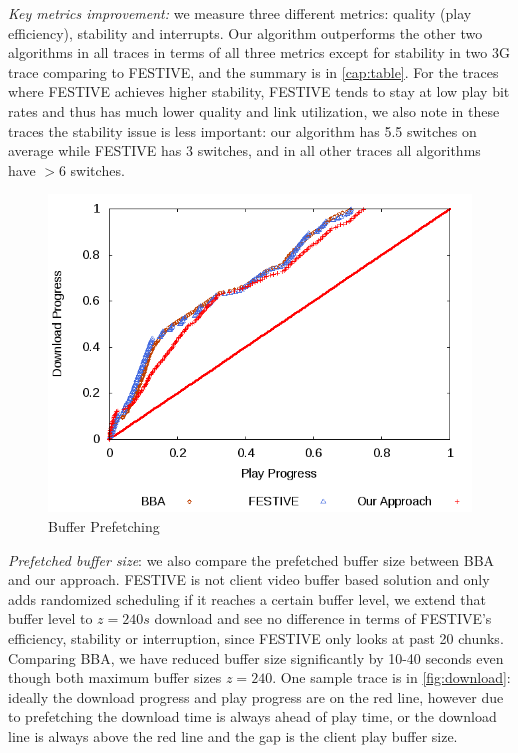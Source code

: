 \emph{Key metrics improvement:} we measure three different metrics: quality (play efficiency), stability and interrupts. Our algorithm outperforms the other two algorithms in all traces in terms of all three metrics except for stability in two 3G trace comparing to FESTIVE, and the summary is in \autoref{cap:table}. For the traces where FESTIVE achieves higher stability, FESTIVE tends to stay at low play bit rates and thus has much lower quality and link utilization, we also note in these traces the stability issue is less important: our algorithm has 5.5 switches on average while FESTIVE has 3 switches, and in all other traces all algorithms have $>$6 switches. 
\begin{figure}[t]
\centering
 \includegraphics[width=0.8\linewidth]{pictures/ATT_downloading.png}
 \caption{Buffer Prefetching} \label{fig:download}
\end{figure}

\emph{Prefetched buffer size}: we also compare the prefetched buffer size between BBA and our approach. FESTIVE is not client video buffer based solution and only adds randomized scheduling if it reaches a certain buffer level, we extend that buffer level to $z=240s$ download and see no difference in terms of FESTIVE's efficiency, stability or interruption, since FESTIVE only looks at past 20 chunks. Comparing BBA, we have reduced buffer size significantly by 10-40 seconds even though both maximum buffer sizes $z=240$. One sample trace is in \autoref{fig:download}: ideally the download progress and play progress are on the red line, however due to prefetching the download time is always ahead of play time, or the download line is always above the red line and the gap is the client play buffer size.

